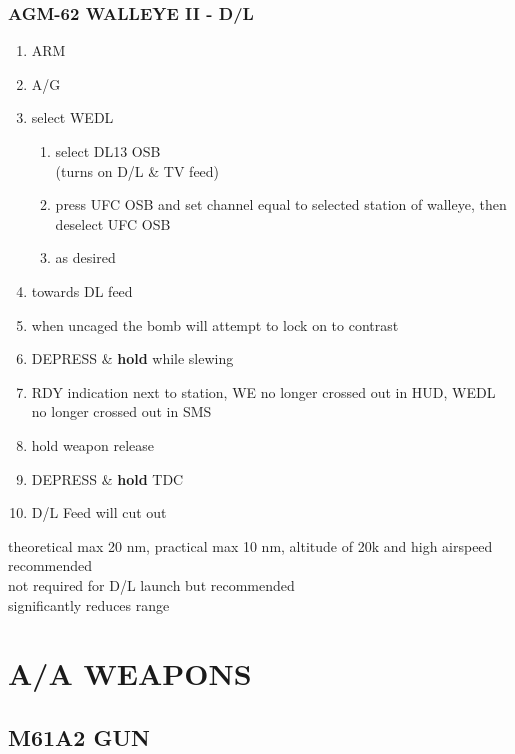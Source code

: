 \documentclass[fontInter]{TechCheck}
\begin{document}
	\subsection{AGM-62 WALLEYE II - D/L}
	\begin{enumerate}
		\item {}\dotfill ARM
		\item {}\dotfill A/G
		\item {}\dotfill select WEDL
		\begin{enumerate}
			\item {}\dotfill select DL13 OSB\\
			\hfill  (turns on D/L \& TV feed)
			\item {}\dotfill press UFC OSB and set channel equal to selected station of walleye, then deselect UFC OSB
			\item {}\dotfill as desired
		\end{enumerate}
		\item {}\dotfill towards DL feed
		\item {}\dotfill when uncaged the bomb will attempt to lock on to contrast
		\item {}\dotfill DEPRESS \& \textbf{hold} while slewing
		\item {}\dotfill RDY indication next to station, WE no longer crossed out in HUD, WEDL no longer crossed out in SMS
		\item {}\dotfill hold weapon release
		\item {}\dotfill DEPRESS \& \textbf{hold} TDC
		\item {}\dotfill D/L Feed will cut out
	\end{enumerate}
	 theoretical max 20 nm, practical max 10 nm,
	altitude of 20k and high airspeed recommended \\
	 not required for D/L launch but recommended \\
	 significantly reduces range

	
	

	\cleardoublepage

	\chapter{A/A WEAPONS}
	\minitoc
	\cleardoublepage

	\section{M61A2 GUN}
\end{document}
